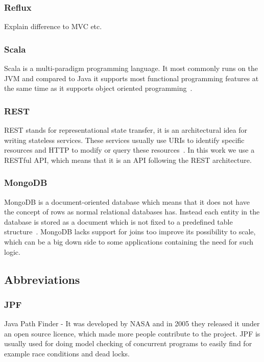 \documentclass[a4paper,12pt]{article}
\begin{document}
\subsubsection{Reflux}
Explain difference to MVC etc.

\subsubsection{Scala}
Scala is a multi-paradigm programming language. It most commonly runs on the JVM and compared to Java it supports 
most functional programming features at the same time as it supports object oriented programming~\cite{SCALA}.

\subsubsection{REST}
REST stands for representational state transfer, it is an architectural idea for writing stateless services. These 
services usually use URIs to identify specific resources and HTTP to modify or query these resources~\cite{REST}. 
In this work we use a RESTful API, which means that it is an API following the REST architecture.

\subsubsection{MongoDB}
MongoDB is a document-oriented database which means that it does not have the concept of rows as normal relational 
databases has. Instead each entity in the database is stored as a document which is not fixed to a predefined table 
structure~\cite{MONGODB}. MongoDB lacks support for joins too improve its possibility to scale, which can be a big 
down side to some applications containing the need for such logic.

\subsection{Abbreviations}

\subsubsection{JPF}
Java Path Finder - It was developed by NASA and in 2005 they released it under an open source licence, which made more 
people contribute to the project. JPF is usually used for doing model checking of concurrent programs to easily find 
for example race conditions and dead locks.
\end{document}
